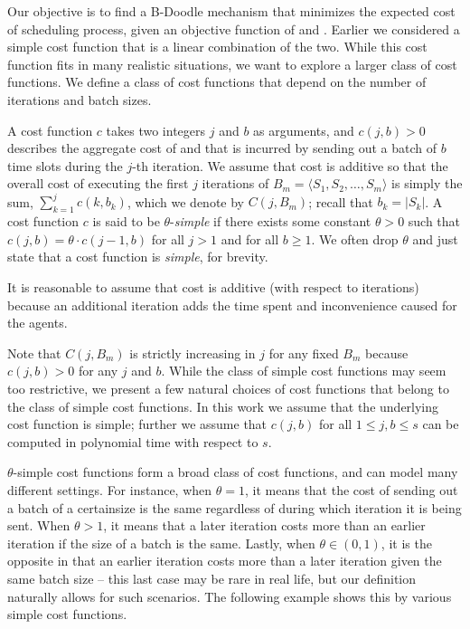 Our objective is to find a B-Doodle mechanism that minimizes the expected cost of scheduling process, given an objective function of \Times and \Inconvenience.  Earlier we considered a simple cost function that is a linear combination of the two.  While this cost function fits in many realistic situations, we want to explore a larger class of cost functions. We define a class of cost functions that depend on the number of iterations and batch sizes.
\begin{definition} \label{bdoodle:def:cost-function}
A cost function $c$ takes two integers $j$ and $b$ as arguments, and $c(j, b) > 0$ describes the aggregate cost of \Times and \Inconveniences that is incurred by sending out a batch of $b$ time slots during the $j$-th iteration. We assume that cost is additive so that the overall cost of executing the first $j$ iterations of ${B}_m = \langle S_1, S_2, \dots, S_m \rangle$ is simply the sum, $\sum_{k=1}^{j} c(k, b_k)$, which we denote by $C(j, {B}_m)$; recall that $b_k = |S_k|$. 
A cost function $c$ is said to be $\theta$-\emph{simple} if there exists some constant $\theta>0$ such that $c(j, b) = \theta \cdot c(j-1, b)$ for all $j > 1$ and for all $b \geq 1$. We often drop $\theta$ and just state that a cost function is \emph{simple}, for brevity.
\end{definition}
It is reasonable to assume that cost is additive (with respect to iterations) because an additional iteration adds the time spent and inconvenience caused for the agents.

Note that $C(j, B_{m})$ is strictly increasing in $j$ for any fixed $B_{m}$ because $c(j, b) > 0$ for any $j$ and $b$. While the class of simple cost functions may seem too restrictive, we present a few natural choices of cost functions that belong to the class of simple cost functions. In this work we assume that the underlying cost function is simple; further we assume that $c(j, b)$ for all $1 \leq j, b \leq s$ can be computed in polynomial time with respect to $s$.

$\theta$-simple cost functions form a broad class of cost functions, and can model many different settings. 
For instance, when $\theta = 1$, it means that the cost of sending out a batch of a certainsize is the same regardless of during which iteration it is being sent. When $\theta > 1$, it means that a later iteration costs more than an earlier iteration if the size of a batch is the same. Lastly, when $\theta \in (0, 1)$, it is the opposite in that an earlier iteration costs more than a later iteration given the same batch size -- this last case may be rare in real life, but our definition naturally allows for such scenarios.
The following example shows this by various simple cost functions. 

